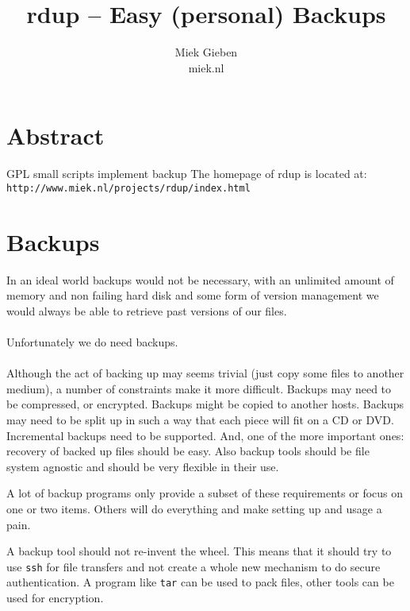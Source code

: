 \documentclass{article}
\newcommand{\rdup}{\textbf{rdup}}
\newcommand{\cmd}[1]{\texttt{#1}}
\newcommand{\url}[1]{\texttt{#1}}
\begin{document}
\pagestyle{empty}

\title{\rdup{} -- Easy (personal) Backups}
\author{Miek Gieben\\miek\@miek.nl}
\date{}
\maketitle
\thispagestyle{empty}

\section*{Abstract}
GPL 
small
scripts implement backup 
The homepage of rdup is located at: 
\url{http://www.miek.nl/projects/rdup/index.html}



\section*{Backups}
In an ideal world backups would not be necessary, with an unlimited
amount of memory and non failing hard disk and some form of version
management we would always be able to retrieve past versions of our files.
\paragraph{}
Unfortunately we do need backups.
\paragraph{}
Although the act of backing up may seems trivial (just copy some files
to another medium), a number of constraints make it more difficult. 
Backups may need to be compressed, or encrypted. Backups might be copied
to another hosts. Backups may need to be split up in such a way that
each piece will fit on a CD or DVD. Incremental backups need to be
supported. And, one of the more important ones: recovery of backed up
files should be easy.  Also backup tools should be file system agnostic
and should be very flexible in their use.

A lot of backup programs only provide a subset of these requirements or
focus on one or two items. Others will do everything and make setting up
and usage a pain.

A backup tool should not re-invent the wheel.  This means that it should
try to use \cmd{ssh} for file transfers and not create a whole new
mechanism to do secure authentication. A program like \cmd{tar} can be
used to pack files, other tools can be used for encryption. 
\end{document}

